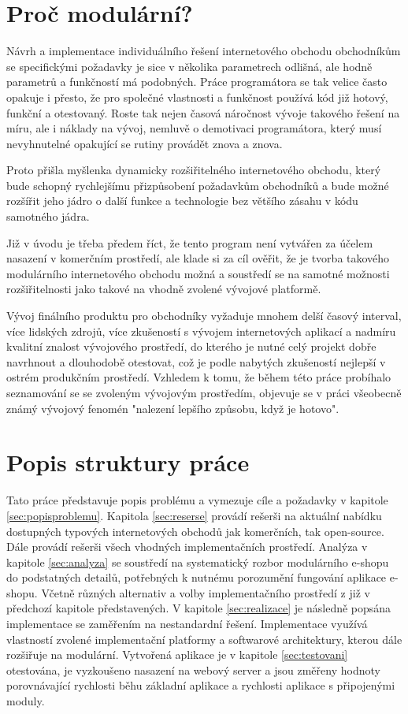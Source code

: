 \documentclass[11pt,twoside,a4paper]{book}
\begin{document}
\section*{Proč modulární?}

Návrh a implementace individuálního řešení internetového obchodu obchodníkům se specifickými požadavky je sice v několika parametrech odlišná, ale hodně parametrů a funkčností má podobných. Práce programátora se tak velice často opakuje i přesto, že pro společné vlastnosti a funkčnost používá kód již hotový, funkční a otestovaný. Roste tak nejen časová náročnost vývoje takového řešení na míru, ale i náklady na vývoj, nemluvě o demotivaci programátora, který musí nevyhnutelné opakující se rutiny provádět znova a znova.

Proto přišla myšlenka dynamicky rozšiřitelného internetového obchodu, který bude schopný rychlejšímu přizpůsobení požadavkům obchodníků a bude možné rozšířit jeho jádro o další funkce a technologie bez většího zásahu v kódu samotného jádra.

Již v úvodu je třeba předem říct, že tento program není vytvářen za účelem nasazení v komerčním prostředí, ale klade si za cíl ověřit, že je tvorba takového modulárního internetového obchodu možná a soustředí se na samotné možnosti rozšiřitelnosti jako takové na vhodně zvolené vývojové platformě.

Vývoj finálního produktu pro obchodníky vyžaduje mnohem delší časový interval, více lidských zdrojů, více zkušeností s vývojem internetových aplikací a nadmíru kvalitní znalost vývojového prostředí, do kterého je nutné celý projekt dobře navrhnout a dlouhodobě otestovat, což je podle nabytých zkušeností nejlepší v ostrém produkčním prostředí. Vzhledem k tomu, že během této práce probíhalo seznamování se se zvoleným vývojovým prostředím, objevuje se v práci všeobecně známý vývojový fenomén "nalezení lepšího způsobu, když je hotovo".


\section{Popis struktury práce}
Tato práce představuje popis problému a vymezuje cíle a požadavky v kapitole \ref{sec:popisproblemu}. Kapitola \ref{sec:reserse} provádí rešerši na aktuální nabídku dostupných typových internetových obchodů jak komerčních, tak open-source. Dále provádí rešerši všech vhodných implementačních prostředí. Analýza v kapitole \ref{sec:analyza} se soustředí na systematický rozbor modulárního e-shopu do podstatných detailů, potřebných k nutnému porozumění fungování aplikace e-shopu. Včetně různých alternativ a volby implementačního prostředí z již v předchozí kapitole představených. V kapitole \ref{sec:realizace} je následně popsána implementace se zaměřením na nestandardní řešení. Implementace využívá vlastností zvolené implementační platformy a softwarové architektury, kterou dále rozšiřuje na modulární. Vytvořená aplikace je v kapitole \ref{sec:testovani} otestována, je vyzkoušeno nasazení na webový server a jsou změřeny hodnoty porovnávající rychlosti běhu základní aplikace a rychlosti aplikace s připojenými moduly.
\end{document}
